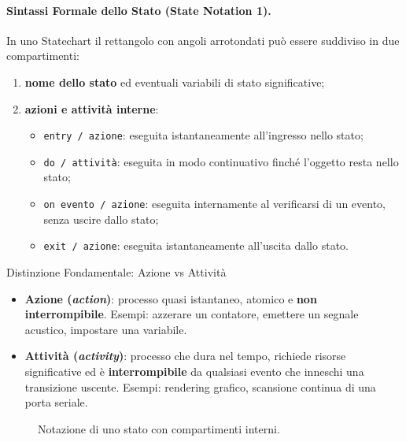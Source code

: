 \documentclass[12pt]{extarticle}
\begin{document}
\paragraph{Sintassi Formale dello Stato (State Notation 1).}
In uno Statechart il rettangolo con angoli arrotondati può essere suddiviso in due compartimenti:
\begin{enumerate}
    \item \textbf{nome dello stato} ed eventuali variabili di stato significative;
    \item \textbf{azioni e attività interne}:
    \begin{itemize}
        \item \texttt{entry / azione}: eseguita istantaneamente all'ingresso nello stato;
        \item \texttt{do / attività}: eseguita in modo continuativo finché l'oggetto resta nello stato;
        \item \texttt{on evento / azione}: eseguita internamente al verificarsi di un evento, senza uscire dallo stato;
        \item \texttt{exit / azione}: eseguita istantaneamente all'uscita dallo stato.
    \end{itemize}
\end{enumerate}

\begin{cbox}{Distinzione Fondamentale: Azione vs Attività}
\begin{itemize}
    \item \textbf{Azione (\textit{action})}: processo quasi istantaneo, atomico e \textbf{non interrompibile}. Esempi: azzerare un contatore, emettere un segnale acustico, impostare una variabile.
    \item \textbf{Attività (\textit{activity})}: processo che dura nel tempo, richiede risorse significative ed è \textbf{interrompibile} da qualsiasi evento che inneschi una transizione uscente. Esempi: rendering grafico, scansione continua di una porta seriale.
\end{itemize}
\end{cbox}

\begin{figure}[htbp]
\centering
{}
\caption{Notazione di uno stato con compartimenti interni.}
\label{fig:state_syntax_internal}
\end{figure}
\end{document}
